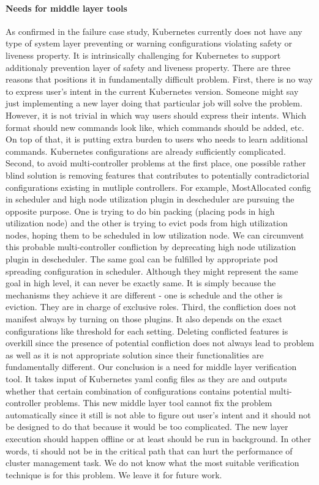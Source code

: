 \paragraph*{Needs for middle layer tools}
As confirmed in the failure case study, Kubernetes currently does not have any type of system layer preventing or warning configurations violating safety or liveness property. It is intrinsically challenging for Kubernetes to support additionaly prevention layer of safety and liveness property. There are three reasons that positions it in fundamentally difficult problem. 
First, there is no way to express user's intent in the current Kubernetes version. Someone might say just implementing a new layer doing that particular job will solve the problem. However, it is not trivial in which way users should express their intents. Which format should new commands look like, which commands should be added, etc. On top of that, it is putting extra burden to users who needs to learn additional commands. Kubernetes configurations are already sufficiently complicated. 
Second, to avoid multi-controller problems at the first place, one possible rather blind solution is removing features that contributes to potentially contradictorial configurations existing in mutliple controllers. For example, MostAllocated config in scheduler and high node utilization plugin in descheduler are pursuing the opposite purpose. One is trying to do bin packing (placing pods in high utilization node) and the other is trying to evict pods from high utilization nodes, hoping them to be scheduled in low utilization node. We can circumvent this probable multi-controller confliction by deprecating high node utilization plugin in descheduler. The same goal can be fulfilled by appropriate pod spreading configuration in scheduler. Although they might represent the same goal in high level, it can never be exactly same. It is simply because the mechanisms they achieve it are different - one is schedule and the other is eviction. They are in charge of exclusive roles.
Third, the confliction does not manifest always by turning on those plugins. It also depends on the exact configurations like threshold for each setting. Deleting conflicted features is overkill since the presence of potential confliction does not always lead to problem as well as it is not appropriate solution since their functionalities are fundamentally different.
Our conclusion is a need for middle layer verification tool. It takes input of Kubernetes yaml config files as they are and outputs whether that certain combination of configurations contains potential multi-controller problems. This new middle layer tool cannot fix the problem automatically since it still is not able to figure out user's intent and it should not be designed to do that because it would be too complicated. The new layer execution should happen offline or at least should be run in background. In other words, ti should not be in the critical path that can hurt the performance of cluster management task. We do not know what the most suitable verification technique is for this problem. We leave it for future work.


